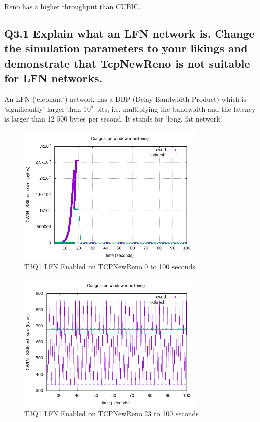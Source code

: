 \documentclass{article}
\begin{document}
Reno has a higher throughput than CUBIC.


\subsection{Q3.1 Explain what an LFN network is. Change the simulation parameters to your likings and demonstrate that TcpNewReno is not suitable for LFN networks.}

An LFN (`elephant') network has a DBP (Delay-Bandwidth Product) which is
`significantly' larger than $10^{5}$ bits, i.e. multiplying the bandwidth and
the latency is larger than 12 500 bytes per second. It stands for `long, fat
network'.


\begin{figure}[H]
	\includegraphics[width=0.8\textwidth]{lab1-group1-task3-question1-1.png}
	\caption{T3Q1 LFN Enabled on TCPNewReno 0 to 100 seconds}
	\label{fig:q311}
\end{figure}


\begin{figure}[H]
	\includegraphics[width=0.8\textwidth]{lab1-group1-task3-question1-2.png}
	\caption{T3Q1 LFN Enabled on TCPNewReno 23 to 100 seconds}
	\label{fig:q312}
\end{figure}
\end{document}

